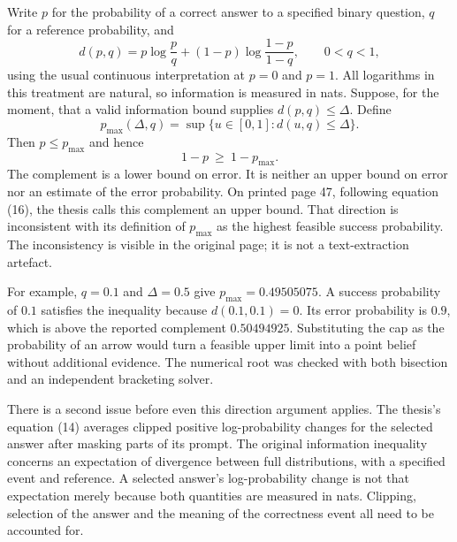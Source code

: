 Write $p$ for the probability of a correct answer to a specified binary
question, $q$ for a reference probability, and
\begin{equation}
 d(p,q)=p\log\frac{p}{q}+(1-p)\log\frac{1-p}{1-q},
 \qquad 0<q<1,
 \label{closure30:bernoulli-kl}
\end{equation}
using the usual continuous interpretation at $p=0$ and $p=1$. All logarithms
in this treatment are natural, so information is measured in nats. Suppose,
for the moment, that a valid information bound supplies
$d(p,q)\leq\Delta$. Define
\begin{equation}
 p_{\max}(\Delta,q)=\sup\{u\in[0,1]:d(u,q)\leq\Delta\}.
 \label{closure30:success-cap}
\end{equation}
Then $p\leq p_{\max}$ and hence
\begin{equation}
 1-p\ \geq\ 1-p_{\max}.
 \label{closure30:error-floor}
\end{equation}
The complement is a lower bound on error. It is neither an upper bound on
error nor an estimate of the error probability. On printed page 47, following
equation (16), the thesis calls this complement an upper bound. That direction
is inconsistent with its definition of $p_{\max}$ as the highest feasible
success probability. The inconsistency is visible in the original page;
it is not a text-extraction artefact.
\citep[p.~47, equations (15)--(16)]{closure30molero}

For example, $q=0.1$ and $\Delta=0.5$ give
$p_{\max}=0.49505075$. A success probability of $0.1$ satisfies the inequality
because $d(0.1,0.1)=0$. Its error probability is $0.9$, which is above the
reported complement $0.50494925$. Substituting the cap as the probability of
an arrow would turn a feasible upper limit into a point belief without
additional evidence. The numerical root was checked with both bisection and
an independent bracketing solver.

There is a second issue before even this direction argument applies.
The thesis's equation (14) averages clipped positive log-probability changes
for the selected answer after masking parts of its prompt. The original
information inequality concerns an expectation of divergence between full
distributions, with a specified event and reference. A selected answer's
log-probability change is not that expectation merely because both quantities
are measured in nats. Clipping, selection of the answer and the meaning of
the correctness event all need to be accounted for.
\citep[pp.~46--47]{closure30molero}

